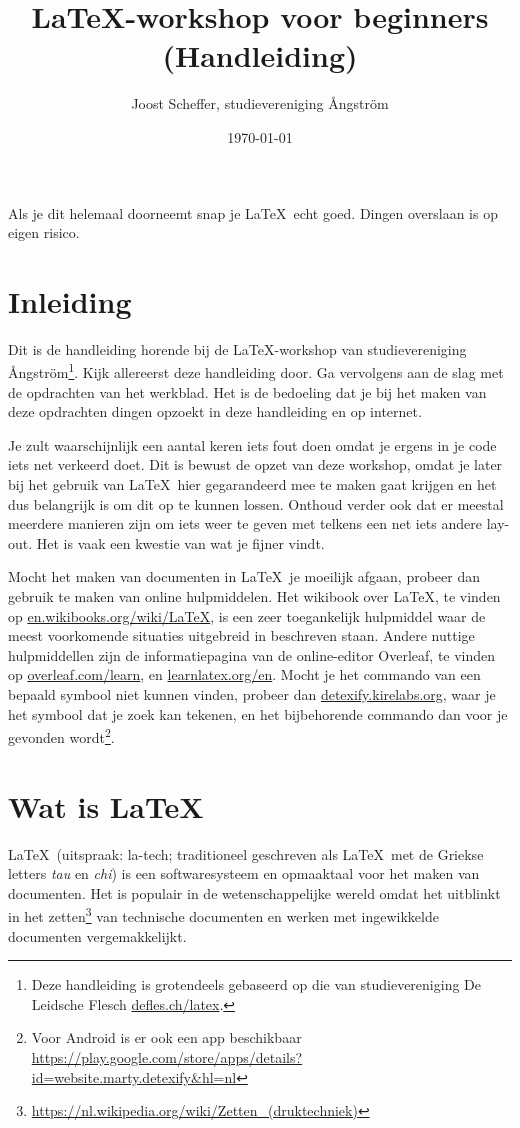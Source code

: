 \documentclass[dutch]{article}
\title{\LaTeX-workshop voor beginners (Handleiding)}
\author{Joost Scheffer, studievereniging Ångström}
\date{\today}
\begin{document}
\maketitle

Als je dit helemaal doorneemt snap je \LaTeX\ echt goed. Dingen overslaan is op eigen risico.
\section{Inleiding}
Dit is de handleiding horende bij de \LaTeX-workshop van studievereniging Ångström\footnote{Deze handleiding is grotendeels gebaseerd op die van studievereniging De Leidsche Flesch \href{https://www.deleidscheflesch.nl/p/latex-workshop}{defles.ch/latex}.}.
Kijk allereerst deze handleiding door.
Ga vervolgens aan de slag met de opdrachten van het werkblad.
Het is de bedoeling dat je bij het maken van deze opdrachten dingen opzoekt in deze handleiding en op internet.

Je zult waarschijnlijk een aantal keren iets fout doen omdat je ergens in je code iets net verkeerd doet.
Dit is bewust de opzet van deze workshop, omdat je later bij het gebruik van \LaTeX\ hier gegarandeerd mee te maken gaat krijgen en het dus belangrijk is om dit op te kunnen lossen.
Onthoud verder ook dat er meestal meerdere manieren zijn om iets weer te geven met telkens een net iets andere lay-out.
Het is vaak een kwestie van wat je fijner vindt.

Mocht het maken van documenten in \LaTeX\ je moeilijk afgaan, probeer dan gebruik te maken van online hulpmiddelen.
Het wikibook over \LaTeX, te vinden op \href{https://en.wikibooks.org/wiki/LaTeX}{en.wikibooks.org/wiki/LaTeX}, is een zeer toegankelijk hulpmiddel waar de meest voorkomende situaties uitgebreid in beschreven staan.
Andere nuttige hulpmiddellen zijn de informatiepagina van de online-editor Overleaf, te vinden op \href{https://www.overleaf.com/learn}{overleaf.com/learn}, en \href{https://www.learnlatex.org/en/}{learnlatex.org/en}.
Mocht je het commando van een bepaald symbool niet kunnen vinden, probeer dan \href{http://detexify.kirelabs.org}{detexify.kirelabs.org}, waar je het symbool dat je zoek kan tekenen, en het bijbehorende commando dan voor je gevonden wordt\footnote{Voor Android is er ook een app beschikbaar \url{https://play.google.com/store/apps/details?id=website.marty.detexify&hl=nl} }.


\section{Wat is \LaTeX}
LaTeX\ (uitspraak: la-tech; traditioneel geschreven als \LaTeX\ met de Griekse letters \textit{tau} en \textit{chi}) is een softwaresysteem en opmaaktaal voor het maken van documenten.
Het is populair in de wetenschappelijke wereld omdat het uitblinkt in het zetten\footnote{\url{https://nl.wikipedia.org/wiki/Zetten_(druktechniek)}} van technische documenten en werken met ingewikkelde documenten vergemakkelijkt.
\end{document}
